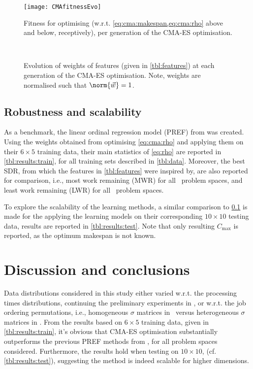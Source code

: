 \begin{figure} 
\texttt{[image: CMAfitnessEvo]}
\caption{Fitness for optimising (w.r.t. \cref{eq:cma:makespan,eq:cma:rho} above and below, receptively), per generation of the CMA-ES optimisation.}\label{fig:cma:fit}
\end{figure}

\begin{figure*} 
\\
\caption{Evolution of weights of features (given in \cref{tbl:features}) at each generation of the CMA-ES optimisation. Note, weights are normalised such that $\norm{\vec{w}}=1$.}\label{fig:cma:wei}
\end{figure*}


\subsection{Robustness and  scalability}\label{sec:expr:robust} 
As a benchmark, the linear ordinal regression model (PREF) from \cite{InRu11a} was created.
Using the weights obtained from optimising \cref{eq:cma:rho} and applying them on their  $6\times5$ training data, their main statistics of \cref{eq:rho} are reported in \cref{tbl:results:train}, for all training sets described in \cref{tbl:data}. Moreover, the best SDR, from which the features in \cref{tbl:features} were inspired by, are also reported for comparison, i.e., most work remaining (MWR) for all \JSP\ problem spaces, and least work remaining (LWR) for all \FSP\ problem spaces.

To explore the scalability of the learning methods, a similar comparison to \cref{sec:expr:robust} is made for the applying the learning models on their corresponding $10\times10$ testing data, results are reported in \cref{tbl:results:test}. Note that only resulting $C_{\max}$ is reported, as the optimum makespan is not known. 

{\setlength{\tabcolsep}{3pt}

}

\section{Discussion and conclusions}\label{sec:disc}
Data distributions considered in this study either varied 
w.r.t. the processing times distributions, continuing the preliminary experiments in  \cite{InRu11a} , or 
w.r.t. the job ordering permutations, i.e., homogeneous $\sigma$ matrices in \FSP\ versus heterogeneous $\sigma$ matrices in \JSP . 
From the results based on $6\times5$ training data, given  in \cref{tbl:results:train}, it's obvious that CMA-ES optimisation substantially outperforms the previous PREF methods from \cite{InRu11a}, for all problem spaces considered. Furthermore, the results hold when testing on $10\times10$, (cf. \cref{tbl:results:test}), suggesting the method is indeed  scalable for higher dimensions. 

